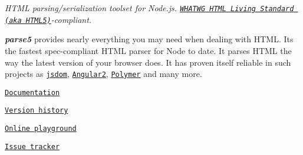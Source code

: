 \href{https://github.com/inikulin/parse5}{\tt } 

{\itshape H\+T\+ML parsing/serialization toolset for Node.\+js. \href{https://html.spec.whatwg.org/multipage/}{\tt W\+H\+A\+T\+WG H\+T\+ML Living Standard (aka H\+T\+M\+L5)}-\/compliant.} 

\href{https://travis-ci.org/inikulin/parse5}{\tt } \href{https://www.npmjs.com/package/parse5}{\tt } \href{https://npmjs.org/package/parse5}{\tt } \href{https://npmjs.org/package/parse5}{\tt } 

{\bfseries {\itshape parse5}} provides nearly everything you may need when dealing with H\+T\+ML. It\textquotesingle{}s the fastest spec-\/compliant H\+T\+ML parser for Node to date. It parses H\+T\+ML the way the latest version of your browser does. It has proven itself reliable in such projects as \href{https://github.com/tmpvar/jsdom}{\tt jsdom}, \href{https://github.com/angular/angular}{\tt Angular2}, \href{https://www.polymer-project.org}{\tt Polymer} and many more. 





\href{http://inikulin.github.io/parse5}{\tt Documentation} 

\href{http://inikulin.github.io/parse5#version-history}{\tt Version history} 

\href{http://astexplorer.net/#/1CHlCXc4n4}{\tt Online playground} 

\href{https://github.com/inikulin/parse5/issues}{\tt Issue tracker} 